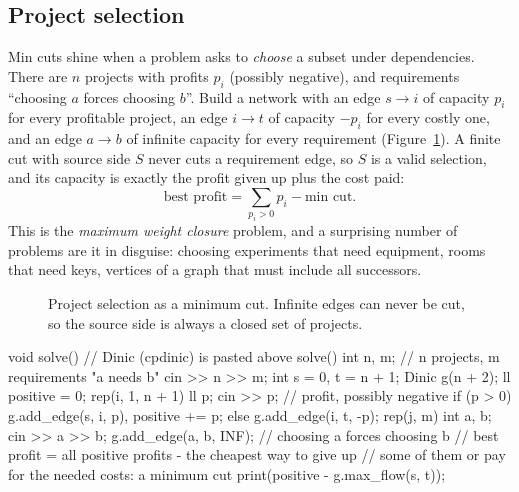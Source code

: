 \subsection{Project selection}

Min cuts shine when a problem asks to \emph{choose} a subset under dependencies. There are $n$ projects with profits $p_i$
(possibly negative), and requirements ``choosing $a$ forces choosing $b$''. Build a network with an edge $s \to i$ of capacity
$p_i$ for every profitable project, an edge $i \to t$ of capacity $-p_i$ for every costly one, and an edge $a \to b$ of infinite
capacity for every requirement (Figure~\ref{fig:projsel}). A finite cut with source side $S$ never cuts a requirement edge, so $S$
is a valid selection, and its capacity is exactly the profit given up plus the cost paid:
\[
  \text{best profit} = \sum_{p_i > 0} p_i - \text{min cut} .
\]
This is the \emph{maximum weight closure} problem, and a surprising number of problems are it in disguise: choosing experiments
that need equipment, rooms that need keys, vertices of a graph that must include all successors.

\begin{figure}[htbp]
\centering
{}
\caption{Project selection as a minimum cut. Infinite edges can never be cut, so the source side is always a closed set of
projects.}
\label{fig:projsel}
\end{figure}

\begin{code}
void solve() {  // Dinic (cpdinic) is pasted above solve()
    int n, m;  // n projects, m requirements "a needs b"
    cin >> n >> m;
    int s = 0, t = n + 1;
    Dinic g(n + 2);
    ll positive = 0;
    rep(i, 1, n + 1) {
        ll p;
        cin >> p;  // profit, possibly negative
        if (p > 0) g.add_edge(s, i, p), positive += p;
        else g.add_edge(i, t, -p);
    }
    rep(j, m) {
        int a, b;
        cin >> a >> b;
        g.add_edge(a, b, INF);  // choosing a forces choosing b
    }
    // best profit = all positive profits - the cheapest way to give up
    // some of them or pay for the needed costs: a minimum cut
    print(positive - g.max_flow(s, t));
}
\end{code}

